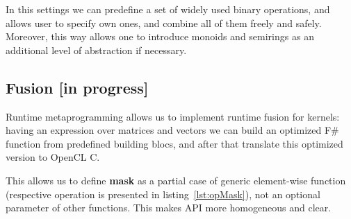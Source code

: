 In this settings we can predefine a set of widely used binary operations, and allows user to specify own ones, and combine all of them freely and safely.
Moreover, this way allows one to introduce monoids and semirings as an additional level of abstraction if necessary.


\subsection{Fusion [in progress]}

Runtime metaprogramming allows us to implement runtime fusion for kernels: having an expression over matrices and vectors we can build an optimized F\# function from predefined building blocs, and after that translate this optimized version to OpenCL C.

This allows us to define \textbf{mask} as a partial case of generic element-wise function (respective operation is presented in listing~\ref{lst:opMask}), not an optional parameter of other functions.
This makes API more homogeneous and clear. 
